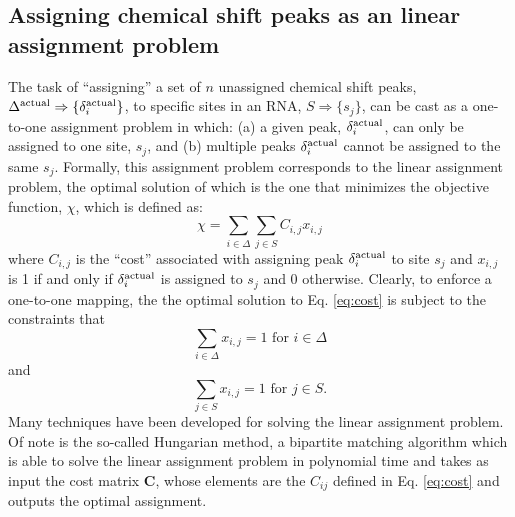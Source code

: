 \documentclass[journal=jcisd8,manuscript=article,layout=onecolumn]{achemso}
\begin{document}
\subsection{Assigning chemical shift peaks as an linear assignment problem}
The task of ``assigning'' a set of  $n$ unassigned chemical shift peaks, $\Delta^{\rm actual}\Rightarrow\{\delta_{i}^{\rm actual}\}$, to specific sites in an RNA, $S\Rightarrow\{s_{j}\}$, can be cast as a one-to-one assignment problem in which: (a) a given peak, $\delta_{i}^{\rm actual}$, can only be assigned to one site, $s_{j}$, and  (b) multiple peaks $\delta_{i}^{\rm actual}$ cannot be assigned to the same  $s_{j}$.  Formally, this assignment problem corresponds to the linear assignment problem, the optimal solution of which is the one that minimizes the objective function, $\chi$, which is defined as:
\begin{equation}\label{eq:cost} 
\chi = \sum_{i \in \Delta} \sum_{j \in S} C_{i,j} x_{i,j}
\end{equation}
where $C_{i,j}$ is the ``cost'' associated with assigning peak $\delta_{i}^{\rm actual}$ to site $s_{j}$ and $x_{i,j}$ is 1 if and only if  $\delta_{i}^{\rm actual}$ is assigned to  $s_{j}$ and 0 otherwise. Clearly, to enforce a one-to-one mapping, the the optimal solution to Eq. \ref{eq:cost} is subject to the constraints that 
\begin{equation}\label{eq:cons1} 
 \sum_{i \in \Delta}  x_{i,j} = 1 \text{ for } i \in \Delta
\end{equation}
and
\begin{equation}\label{eq:cons2} 
 \sum_{j \in S}  x_{i,j} = 1  \text{ for } j \in S.
\end{equation}
Many techniques have been developed for solving the linear assignment problem. Of note is the so-called Hungarian method, a bipartite matching algorithm which is able to solve the linear assignment problem in polynomial time\cite{kuhn1955hungarian, munkres1957algorithms} and takes as input the cost matrix \textbf{C}, whose elements are the $C_{ij}$ defined in Eq. \ref{eq:cost} and outputs the optimal assignment.
 
\end{document}
